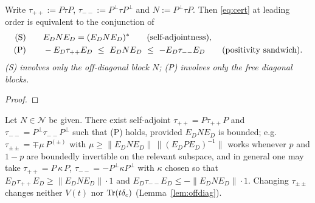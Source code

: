 \documentclass[11pt]{article}
\begin{document}
\begin{proposition}\label{prop:split}
Write $\tau_{++}:=P\tau P$, $\tau_{--}:=P^\perp\tau P^\perp$ and $N:=P^\perp\tau P$.
Then \eqref{eq:cert} at leading order is equivalent to the conjunction of
\begin{align}
 \text{\rm(S)}\qquad & E_DNE_D=(E_DNE_D)^* \qquad\text{(self-adjointness)},\label{eq:S}\\
 \text{\rm(P)}\qquad & -E_D\tau_{++}E_D\ \le\ E_DNE_D\ \le\ -E_D\tau_{--}E_D
  \qquad\text{(positivity sandwich)} .\label{eq:P}
\end{align}
\emph{(S) involves only the off-diagonal block $N$; (P) involves only the free diagonal
blocks.}
\end{proposition}
\begin{proof}
\end{proof}

\begin{corollary}\label{cor:Pfree}
Let $N\in\mathcal N$ be given.  There exist self-adjoint $\tau_{++}=P\tau_{++}P$ and
$\tau_{--}=P^\perp\tau_{--}P^\perp$ such that {\rm(P)} holds, provided
$E_DNE_D$ is bounded; e.g.\ $\tau_{\pm\pm}=\mp\mu\,P^{(\pm)}$ with
$\mu\ge\|E_DNE_D\|\,\|(E_DPE_D)^{-1}\|$ works whenever $p$ and $1-p$ are boundedly
invertible on the relevant subspace, and in general one may take
$\tau_{++}=P\,\kappa\,P$, $\tau_{--}=-P^\perp\kappa P^\perp$ with $\kappa$ chosen so that
$E_D\tau_{++}E_D\ge\|E_DNE_D\|\cdot 1$ and $E_D\tau_{--}E_D\le-\|E_DNE_D\|\cdot1$.
Changing $\tau_{\pm\pm}$ changes neither $V(t)$ nor $\operatorname{Tr}(t\delta_c)$
(Lemma~\ref{lem:offdiag}).
\end{corollary}
\end{document}
